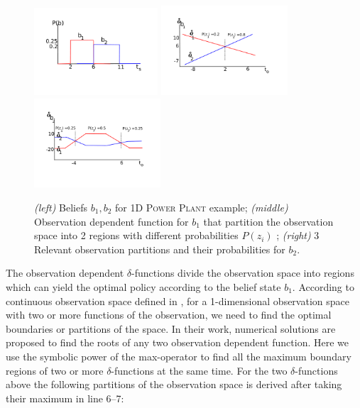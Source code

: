 \documentclass{article} %
\begin{document}
\begin{figure}[tbp!]
\vspace{-6mm}
\centering
\hspace{-17mm}
\includegraphics[width=0.41\textwidth]{pics/beliefs.pdf}
\hspace{-12mm}
\includegraphics[width=0.42\textwidth]{pics/delta1.pdf}
\hspace{-12mm}
\includegraphics[width=0.42\textwidth]{pics/delta2.pdf}
\hspace{-17mm}
\vspace{-10mm}
\caption{\footnotesize 
{\it (left)} Beliefs $b_1,b_2$ for 1D \textsc{Power Plant} example; 
{\it (middle)} Observation dependent function for $b_1$ that partition the observation space into 2 regions with different probabilities $P(z_i)$ ; 
{\it (right)} 3 Relevant observation partitions and their probabilities for $b_2$.
}
\label{fig:timeSpace}
\vspace{-4mm}
\end{figure}
The observation dependent $\delta$-functions divide the observation space into regions which can yield the optimal policy according to the belief state $b_1$. According to continuous observation space defined in \cite{pascal_ijcai05}, for a 1-dimensional observation space with two or more functions of the observation, we need to find the optimal boundaries or partitions of the space. In their work, numerical solutions are proposed to find the roots of any two observation dependent function. Here we use the symbolic power of the max-operator to find all the maximum boundary regions of two or more $\delta$-functions at the same time. For the two $\delta$-functions above the following partitions of the observation space is derived after taking their maximum in line 6--7: 
\end{document}
